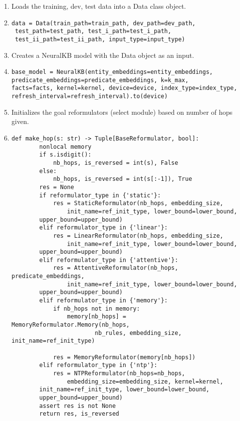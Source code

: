 \documentclass[Other]{iitddiss}
\begin{document}
\begin{enumerate}
\item Loads the training, dev, test data into a Data class object.
\item {\begin{lstlisting}
data = Data(train_path=train_path, dev_path=dev_path,
 test_path=test_path, test_i_path=test_i_path, 
 test_ii_path=test_ii_path, input_type=input_type)
	\end{lstlisting}}
\item Creates a NeuralKB model with the Data object as an input.
\item {\begin{lstlisting}
base_model = NeuralKB(entity_embeddings=entity_embeddings, 
predicate_embeddings=predicate_embeddings, k=k_max, 
facts=facts, kernel=kernel, device=device, index_type=index_type, 
refresh_interval=refresh_interval).to(device)	\end{lstlisting}}
\item Initializes the goal reformulators (select module) based on number of hops given.
\item {\begin{lstlisting}
def make_hop(s: str) -> Tuple[BaseReformulator, bool]:
        nonlocal memory
        if s.isdigit():
            nb_hops, is_reversed = int(s), False
        else:
            nb_hops, is_reversed = int(s[:-1]), True
        res = None
        if reformulator_type in {'static'}:
            res = StaticReformulator(nb_hops, embedding_size, 
            	init_name=ref_init_type, lower_bound=lower_bound, 
		upper_bound=upper_bound)
        elif reformulator_type in {'linear'}:
            res = LinearReformulator(nb_hops, embedding_size, 
            	init_name=ref_init_type, lower_bound=lower_bound, 
		upper_bound=upper_bound)
        elif reformulator_type in {'attentive'}:
            res = AttentiveReformulator(nb_hops, predicate_embeddings,
            	init_name=ref_init_type, lower_bound=lower_bound, 
		upper_bound=upper_bound)
        elif reformulator_type in {'memory'}:
            if nb_hops not in memory:
                memory[nb_hops] = MemoryReformulator.Memory(nb_hops, 
                		nb_rules, embedding_size, init_name=ref_init_type)

            res = MemoryReformulator(memory[nb_hops])
        elif reformulator_type in {'ntp'}:
            res = NTPReformulator(nb_hops=nb_hops, 
            	embedding_size=embedding_size, kernel=kernel, 
		init_name=ref_init_type, lower_bound=lower_bound, 
		upper_bound=upper_bound)
        assert res is not None
        return res, is_reversed
        \end{lstlisting}}


\end{enumerate}
\end{document}
